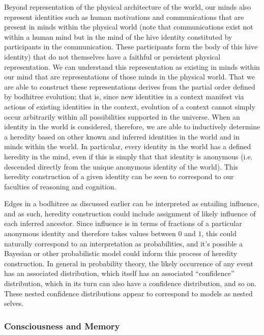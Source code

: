 \documentclass[pra,twocolumn,groupedaddress,10pt]{revtex4}
\theoremstyle{definition}
\begin{document}
Beyond representation of the physical architecture of the world, our minds also represent identities such as human motivations and communications that are present in minds within the physical world (note that communications exist not within a human mind but in the mind of the hive identity constituted by participants in the communication. These participants form the body of this hive identity) that do not themselves have a faithful or persistent physical representation. We can understand this representation as existing in minds within our mind that are representations of those minds in the physical world. That we are able to construct these representations derives from the partial order defined by bodhitree evolution; that is, since new identities in a context manifest via actions of existing identities in the context, evolution of a context cannot simply occur arbitrarily within all possibilities supported in the universe. When an identity in the world is considered, therefore, we are able to inductively determine a heredity based on other known and inferred identities in the world and in minds within the world. In particular, every identity in the world has a defined heredity in the mind, even if this is simply that that identity is anonymous (i.e. descended directly from the unique anonymous identity of the world). This heredity construction of a given identity can be seen to correspond to our faculties of reasoning and cognition.

Edges in a bodhitree as discussed earlier can be interpreted as entailing influence, and as such, heredity construction could include assignment of likely influence of each inferred ancestor. Since influence is in terms of fractions of a particular anonymous identity and therefore takes values between $0$ and $1$, this could naturally correspond to an interpretation as probabilities, and it's possible a Bayesian or other probabilistic model could inform this process of heredity construction. In general in probability theory, the likely occurrence of any event has an associated distribution, which itself has an associated ``confidence'' distribution, which in its turn can also have a confidence distribution, and so on. These nested confidence distributions appear to correspond to models as nested selves.

\subsubsection{Consciousness and Memory} \label{sec:conmem}
\end{document}
